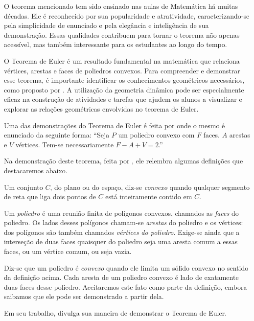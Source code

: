 O teorema mencionado tem sido ensinado nas aulas de Matemática há muitas décadas. Ele é reconhecido por sua popularidade e atratividade, caracterizando-se pela simplicidade de enunciado e pela elegância e inteligência de sua demonstração. Essas qualidades contribuem para tornar o teorema não apenas acessível, mas também interessante para os estudantes ao longo do tempo.

O Teorema de Euler é um resultado fundamental na matemática que relaciona vértices, arestas e faces de poliedros convexos. Para compreender e demonstrar esse teorema, é importante identificar os conhecimentos geométricos necessários, como proposto por \cite{Pereira2022}. A utilização da geometria dinâmica pode ser especialmente eficaz na construção de atividades e tarefas que ajudem os alunos a visualizar e explorar as relações geométricas envolvidas no teorema de Euler.

Uma das demonstrações do Teorema de Euler é feita por  onde o mesmo é enunciado da seguinte forma: ``Seja $P$ um poliedro convexo com $F$ faces. $A$ arestas e $V$ vértices. Tem-se necessariamente \textcolor[HTML]{0000FF}{$F - A + V = 2$}.''

Na demonstração deste teorema, feita por , ele relembra algumas definições que destacaremos abaixo.

\begin{citacao}
    Um conjunto $C$, do plano ou do espaço, diz-se \textit{convexo} quando qualquer segmento de reta que liga dois pontos de $C$ está inteiramente contido em $C$.

    Um \textit{poliedro} é uma reunião finita de polígonos convexos, chamados as \textit{faces} do poliedro. Os lados desses polígonos chamam-se \textit{arestas} do poliedro e os vértices: dos polígonos são também chamados \textit{vértices do poliedro}. Exige-se ainda que a interseção de duas faces quaisquer do poliedro seja uma aresta comum a essas faces, ou um vértice comum, ou seja vazia.

    Diz-se que um poliedro é \textit{convexo} quando ele limita um sólido convexo no sentido da definição acima. Cada aresta de um poliedro convexo é lado de exatamente duas faces desse poliedro. Aceitaremos este fato como parte da definição, embora saibamos que ele pode ser demonstrado a partir dela.
\end{citacao}

Em seu trabalho,  divulga sua maneira de demonstrar o Teorema de Euler.

